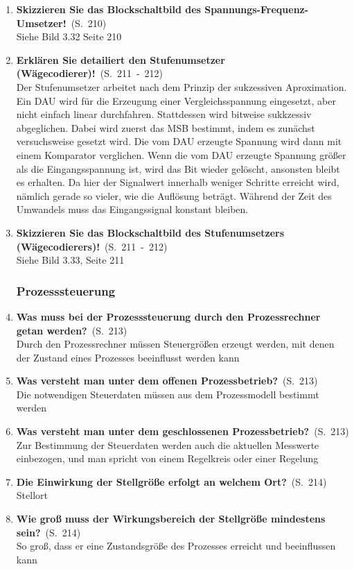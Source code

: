 \documentclass[a4paper,12pt]{article}
\newcommand{\question}[3]{\pagebreak[3]\item {\textbf{#1?}}\ (S.\ #2)#3}
\newcommand{\statement}[3]{\pagebreak[3]\item {\textbf{#1!}}\ (S.\ #2)#3}
\newcommand{\normaltext}[1]{\\#1}
\newcommand{\page}[1]{#1}
\newcommand{\pages}[2]{#1\ -\ #2}
\begin{document}
\begin{enumerate}
  \statement{Skizzieren Sie das Blockschaltbild des Spannungs-Frequenz-Umsetzer} {\page{210}}
  {
    \normaltext{Siehe Bild 3.32 Seite 210}
  }

  \statement{Erklären Sie detailiert den Stufenumsetzer (Wägecodierer)}{\pages{211}{212}}
  {
    \normaltext{Der Stufenumsetzer arbeitet nach dem Prinzip der sukzessiven Aproximation. Ein DAU
                wird für die Erzeugung einer Vergleichsspannung eingesetzt, aber nicht einfach linear
                durchfahren. Stattdessen wird bitweise sukkzessiv abgeglichen. Dabei wird zuerst das
                MSB bestimmt, indem es zunächst versuchsweise gesetzt wird. Die vom DAU erzeugte
                Spannung wird dann mit einem Komparator verglichen. Wenn die vom DAU erzeugte Spannung
                größer als die Eingangsspannung ist, wird das Bit wieder gelöscht, ansonsten bleibt
                es erhalten. Da hier der Signalwert innerhalb weniger Schritte erreicht wird, nämlich
                gerade so vieler, wie die Auflösung beträgt. Während der Zeit des Umwandels muss das
                Eingangssignal konstant bleiben.}
  }

  \statement{Skizzieren Sie das Blockschaltbild des Stufenumsetzers (Wägecodierers)} {\pages{211}{212}}
  {
    \normaltext{Siehe Bild 3.33, Seite 211}
  }

  \subsubsection{Prozesssteuerung}

  \question{Was muss bei der Prozesssteuerung durch den Prozessrechner getan werden}{\page{213}}
  {
    \normaltext{Durch den Prozessrechner müssen Steuergrößen erzeugt werden, mit denen der Zustand
                eines Prozesses beeinflusst werden kann}
  }

  \question{Was versteht man unter dem offenen Prozessbetrieb}{\page{213}}
  {
    \normaltext{Die notwendigen Steuerdaten müssen aus dem Prozessmodell bestimmt werden}
  }

  \question{Was versteht man unter dem geschlossenen Prozessbetrieb}{\page{213}}
  {
    \normaltext{Zur Bestimmung der Steuerdaten werden auch die aktuellen Messwerte einbezogen,
                und man spricht von einem Regelkreis oder einer Regelung}
  }

  \question{Die Einwirkung der Stellgröße erfolgt an welchem Ort}{\page{214}}
  {
    \normaltext{Stellort}
  }

  \question{Wie groß muss der Wirkungsbereich der Stellgröße mindestens sein}{\page{214}}
  {
    \normaltext{So groß, dass er eine Zustandsgröße des Prozesses erreicht und
                beeinflussen kann}
  }


\end{enumerate}
\end{document}
